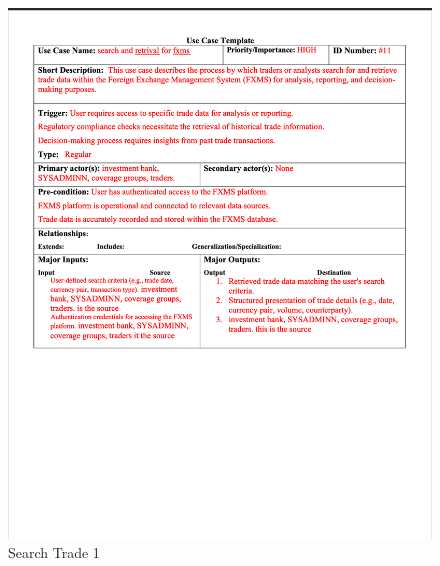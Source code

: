 \documentclass[a4paper]{report}
\begin{document}
\begin{figure}[h!]
    \centering
    \includegraphics[width=\textwidth]{images/uc/11.1-search-trade.png}
    \caption{Search Trade 1}
    \label{fig:11.1-search-trade}
\end{figure}
\end{document}
